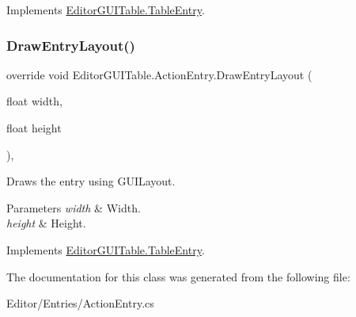 Implements \mbox{\hyperlink{class_editor_g_u_i_table_1_1_table_entry_ae02e641122da6dd161d61a20576812ca}{Editor\+G\+U\+I\+Table.\+Table\+Entry}}.

\mbox{\label{class_editor_g_u_i_table_1_1_action_entry_ae556137b72e1e356a2e4cf4a12b88336}} 
\subsubsection{\texorpdfstring{Draw\+Entry\+Layout()}{DrawEntryLayout()}}
{\footnotesize\ttfamily override void Editor\+G\+U\+I\+Table.\+Action\+Entry.\+Draw\+Entry\+Layout (\begin{DoxyParamCaption}\item[{float}]{width,  }\item[{float}]{height }\end{DoxyParamCaption})\hspace{0.3cm}{\ttfamily [inline]}, {\ttfamily [virtual]}}



Draws the entry using G\+U\+I\+Layout. 


\begin{DoxyParams}{Parameters}
{\em width} & Width.\\
\hline
{\em height} & Height.\\
\hline
\end{DoxyParams}


Implements \mbox{\hyperlink{class_editor_g_u_i_table_1_1_table_entry_abe1e2747e56d50731eeec28635b366a1}{Editor\+G\+U\+I\+Table.\+Table\+Entry}}.



The documentation for this class was generated from the following file\+:\begin{DoxyCompactItemize}
\item 
Editor/\+Entries/Action\+Entry.\+cs\end{DoxyCompactItemize}
